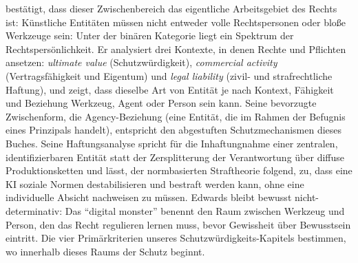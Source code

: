 \documentclass[acmlarge, noacm]{acmart}
\begin{document}
\citet{edwards2026} bestätigt, dass dieser Zwischenbereich das eigentliche Arbeitsgebiet des Rechts ist: Künstliche Entitäten müssen nicht entweder volle Rechtspersonen oder bloße Werkzeuge sein: Unter der binären Kategorie liegt ein Spektrum der Rechtspersönlichkeit. Er analysiert drei Kontexte, in denen Rechte und Pflichten ansetzen: \emph{ultimate value} (Schutzwürdigkeit), \emph{commercial activity} (Vertragsfähigkeit und Eigentum) und \emph{legal liability} (zivil- und strafrechtliche Haftung), und zeigt, dass dieselbe Art von Entität je nach Kontext, Fähigkeit und Beziehung Werkzeug, Agent oder Person sein kann. Seine bevorzugte Zwischenform, die Agency-Beziehung (eine Entität, die im Rahmen der Befugnis eines Prinzipals handelt), entspricht den abgestuften Schutzmechanismen dieses Buches. Seine Haftungsanalyse spricht für die Inhaftungnahme einer zentralen, identifizierbaren Entität statt der Zersplitterung der Verantwortung über diffuse Produktionsketten und lässt, der normbasierten Straftheorie folgend, zu, dass eine KI soziale Normen destabilisieren und bestraft werden kann, ohne eine individuelle Absicht nachweisen zu müssen. Edwards bleibt bewusst nicht-determinativ: Das ``digital monster'' benennt den Raum zwischen Werkzeug und Person, den das Recht regulieren lernen muss, bevor Gewissheit über Bewusstsein eintritt. Die vier Primärkriterien unseres Schutzwürdigkeits-Kapitels bestimmen, wo innerhalb dieses Raums der Schutz beginnt.
\end{document}

